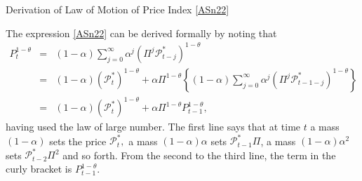 \documentclass[11pt,aspectratio=169]{beamer}
\begin{document}
\begin{frame}[label=Appendix E]{Derivation of Law of Motion of Price Index \eqref{ASn22}} 

The expression \eqref{ASn22} can be derived formally by noting
that%
\begin{eqnarray*}
P_{t}^{1-\theta } &=&(1-\alpha )\sum_{j=0}^{\infty }\alpha ^{j}(\Pi ^{j}%
\mathcal{P}_{t-j}^{\ast })^{1-\theta } \\
&=&(1-\alpha )(\mathcal{P}_{t}^{\ast })^{1-\theta }+\alpha \Pi ^{1-\theta
}\left\{ (1-\alpha )\sum_{j=0}^{\infty }\alpha ^{j}(\Pi ^{j}\mathcal{P}%
_{t-1-j}^{\ast })^{1-\theta }\right\} \\
&=&(1-\alpha )(\mathcal{P}_{t}^{\ast })^{1-\theta }+\alpha \Pi ^{1-\theta
}P_{t-1}^{1-\theta },
\end{eqnarray*}%
having used the law of large number. The first line says that at time $t$ a
mass $(1-\alpha )$ sets the price $\mathcal{P}_{t}^{\ast },$ a mass $%
(1-\alpha )\alpha $ sets $\mathcal{P}_{t-1}^{\ast }\Pi $, a mass $(1-\alpha
)\alpha ^{2}$ sets $\mathcal{P}_{t-2}^{\ast }\Pi ^{2}$ and so forth. From
the second to the third line, the term in the curly bracket is $%
P_{t-1}^{1-\theta }$.

\begin{center}
\hyperlink{CalvoPriceIndex}{}
\end{center}
\end{frame}
\end{document}
